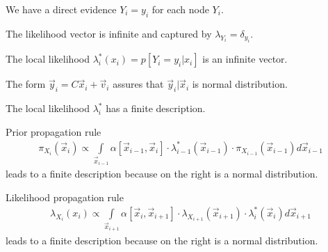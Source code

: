 \documentclass[landscape,footrule]{foils}
\begin{document}
\begin{triangles}
\item We have a direct evidence $Y_i=y_i$ for each node $Y_i$. 
\item The likelihood vector is infinite and captured by $\lambda_{Y_i}=\delta_{y_i}$.
\item The local likelihood $\lambda_i^*(x_i)=p[Y_i=y_i|x_i]$ is an infinite vector. 
\item The form $\vec{y}_{i}=C\vec{x}_i+\vec{v}_i$ assures that $\vec{y}_{i}|\vec{x}_i$ is normal distribution.
\item The local likelihood $\lambda_i^*$ has a finite description.
\end{triangles}


\enlargethispage{1cm}

\vspace*{-1.0cm}

Prior propagation rule
\begin{align*}
\pi_{X_i}(\vec{x}_i)\propto \int\limits_{\vec{x}_{i-1}} \alpha[\vec{x}_{i-1}, \vec{x}_i]\cdot\lambda_{i-1}^*(\vec{x}_{i-1})\cdot \pi_{X_{i-1}}(\vec{x}_{i-1})d\vec{x}_{i-1}
\end{align*}
leads to a finite description because on the right is a normal distribution. 


\enlargethispage{1cm}

\vspace*{-1.0cm}

Likelihood propagation rule
\begin{align*}
\lambda_{X_i}(x_i)\propto \int\limits_{\vec{x}_{i+1}} \alpha[\vec{x}_{i}, \vec{x}_{i+1}]\cdot\lambda_{X_{i+1}}(\vec{x}_{i+1})\cdot \lambda_{i}^*(\vec{x}_{i}) d\vec{x}_{i+1}
\end{align*}
leads to a finite description because on the right is a normal distribution. 
\end{document}
